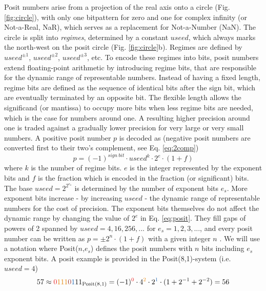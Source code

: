 \documentclass[draft]{agujournal2019}
\newcommand{\op}{\operatorname}
\begin{document}
Posit numbers arise from a projection of the real axis onto a circle (Fig. \ref{fig:circle}), with only one bitpattern for zero and one for complex infinity (or Not-a-Real, NaR), which serves as a replacement for Not-a-Number (NaN). The circle is split into \emph{regimes}, determined by a constant $useed$, which always marks the north-west on the posit circle (Fig. \ref{fig:circle}b). Regimes are defined by $useed^{\pm1}$, $useed^{\pm2}$, $useed^{\pm3}$, etc. To encode these regimes into bits, posit numbers extend floating-point arithmetic by introducing regime bits, that are responsible for the dynamic range of representable numbers. Instead of having a fixed length, regime bits are defined as the sequence of identical bits after the sign bit, which are eventually terminated by an opposite bit. The flexible length allows the significand (or mantissa) to occupy more bits when less regime bits are needed, which is the case for numbers around one. A resulting higher precision around one is traded against a gradually lower precision for very large or very small numbers. A positive posit number $p$ is decoded as \cite{Gustafson2017,Gustafson2017a} (negative posit numbers are converted first to their two's complement, see Eq. \ref{eq:2comp})
\begin{equation}
p = (-1)^{sign~bit} \cdot useed^k \cdot 2^e \cdot (1+f)
\label{eq:posit}
\end{equation}
where $k$ is the number of regime bits. $e$ is the integer represented by the exponent bits and $f$ is the fraction which is encoded in the fraction (or significant) bits. The base $useed = 2^{2^{e_s}}$ is determined by the number of exponent bits $e_s$. More exponent bits increase - by increasing $useed$ - the dynamic range of representable numbers for the cost of precision. The exponent bits themselves do not affect the dynamic range by changing the value of $2^e$ in Eq. \ref{eq:posit}. They fill gaps of powers of 2 spanned by $useed = 4,16,256,...$ for $e_s=1,2,3,...$, and every posit number can be written as $p = \pm 2^n \cdot (1+f)$ with a given integer $n$ \cite{Gustafson2017,Chen2018}. We will use a notation where Posit($n$,$e_s$) defines the posit numbers with $n$ bits including $e_s$ exponent bits. A posit example is provided in the Posit(8,1)-system (i.e. $useed = 4$)
\begin{equation}
57 \approx {\color{psign}0}{\color{pregime}111}{\color{pregimet}0}{\color{pexpo}1}11_{\op{Posit}(8,1)} = (-1)^{\color{psign}0} \cdot 4^{\color{pregime}2} \cdot 2^{\color{pexpo}1} \cdot (1+2^{-1}+2^{-2}) = 56
\label{eq:posit_pos}
\end{equation}
\end{document}
